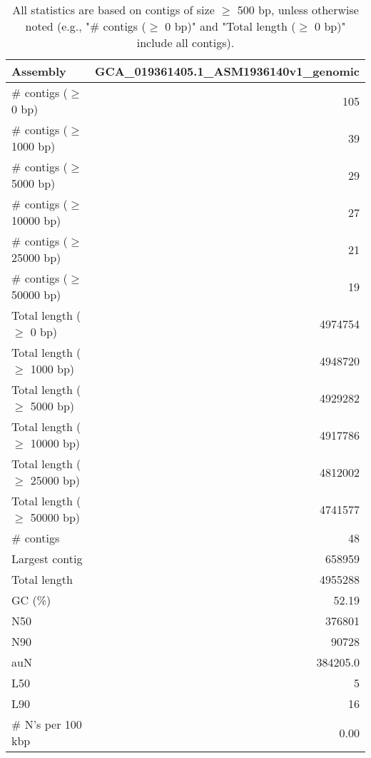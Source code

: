 \documentclass[12pt,a4paper]{article}
\begin{document}
\begin{table}[ht]
\begin{center}
\caption{All statistics are based on contigs of size $\geq$ 500 bp, unless otherwise noted (e.g., "\# contigs ($\geq$ 0 bp)" and "Total length ($\geq$ 0 bp)" include all contigs).}
\begin{tabular}{|l*{1}{|r}|}
\hline
Assembly & GCA\_019361405.1\_ASM1936140v1\_genomic \\ \hline
\# contigs ($\geq$ 0 bp) & 105 \\ \hline
\# contigs ($\geq$ 1000 bp) & 39 \\ \hline
\# contigs ($\geq$ 5000 bp) & 29 \\ \hline
\# contigs ($\geq$ 10000 bp) & 27 \\ \hline
\# contigs ($\geq$ 25000 bp) & 21 \\ \hline
\# contigs ($\geq$ 50000 bp) & 19 \\ \hline
Total length ($\geq$ 0 bp) & 4974754 \\ \hline
Total length ($\geq$ 1000 bp) & 4948720 \\ \hline
Total length ($\geq$ 5000 bp) & 4929282 \\ \hline
Total length ($\geq$ 10000 bp) & 4917786 \\ \hline
Total length ($\geq$ 25000 bp) & 4812002 \\ \hline
Total length ($\geq$ 50000 bp) & 4741577 \\ \hline
\# contigs & 48 \\ \hline
Largest contig & 658959 \\ \hline
Total length & 4955288 \\ \hline
GC (\%) & 52.19 \\ \hline
N50 & 376801 \\ \hline
N90 & 90728 \\ \hline
auN & 384205.0 \\ \hline
L50 & 5 \\ \hline
L90 & 16 \\ \hline
\# N's per 100 kbp & 0.00 \\ \hline
\end{tabular}
\end{center}
\end{table}
\end{document}
